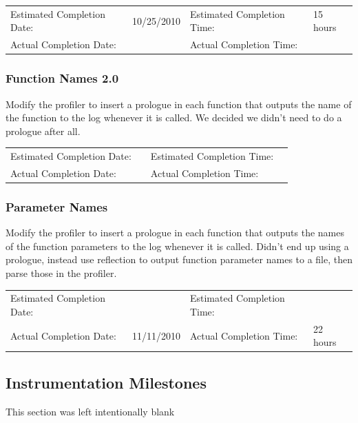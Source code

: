 \documentclass{article}
\newcommand{\timetbl}[4]{\par\vspace{5mm}\begin{tabular}{ l l l l }
Estimated Completion Date: & #1 & Estimated Completion Time: & #2 \\
Actual Completion Date: & #3 & Actual Completion Time: & #4 \\
\end{tabular}}
\begin{document}
\timetbl{10/25/2010}{15 hours}{}{}

\subsubsection{Function Names 2.0}
Modify the profiler to insert a prologue in each function that outputs the name of the function to the log whenever it is called.
We decided we didn't need to do a prologue after all.
\timetbl{}{}{}{}

\subsubsection{Parameter Names}
Modify the profiler to insert a prologue in each function that outputs the names of the function parameters to the log whenever it is called.
Didn't end up using a prologue, instead use reflection to output function parameter names to a file, then parse those in the profiler.
\timetbl{}{}{11/11/2010}{22 hours}

\subsection{Instrumentation Milestones}

This section was left intentionally blank



\end{document}

